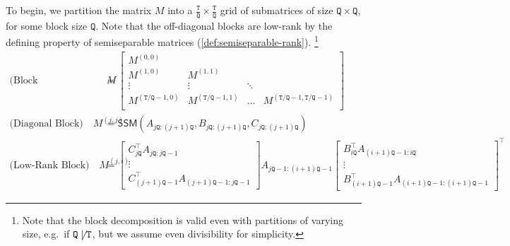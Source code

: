 To begin, we partition the matrix $M$ into a $\frac{\mathtt{T}}{\mathtt{Q}} \times \frac{\mathtt{T}}{\mathtt{Q}}$ grid of submatrices of size $\mathtt{Q} \times \mathtt{Q}$,
for some block size $\mathtt{Q}$.
Note that the off-diagonal blocks are low-rank by the defining property of semiseparable matrices (\cref{def:semiseparable-rank}).%
\footnote{Note that the block decomposition is valid even with partitions of varying size, e.g.\ if $\mathtt{Q} \not\mid \mathtt{T}$, but we assume even divisibility for simplicity.}
\begin{align*}%
  \text{(Block Decomposition)} \quad M &=
  \begin{bmatrix}
    M^{(0,0)} \\
    M^{(1,0)} & M^{(1,1)} \\
    \vdots & \vdots & \ddots \\
    M^{(\mathtt{T}/\mathtt{Q}-1,0)} & M^{(\mathtt{T}/\mathtt{Q}-1,1)} & \dots & M^{(\mathtt{T}/\mathtt{Q}-1,\mathtt{T}/\mathtt{Q}-1)} \\
  \end{bmatrix}
  \\
  \text{(Diagonal Block)} \quad M^{(j,j)} &= \mathsf{SSM}(A_{j\mathtt{Q}:(j+1)\mathtt{Q}}, B_{j\mathtt{Q}:(j+1)\mathtt{Q}}, C_{j\mathtt{Q}:(j+1)\mathtt{Q}}) \\
  \text{(Low-Rank Block)} \quad M^{(j,i)} &= 
  \begin{bmatrix}C_{j\mathtt{Q}}^{\top} A_{j\mathtt{Q}:j\mathtt{Q}-1} \\[1pt] \vdots \\[1pt] C_{(j+1)\mathtt{Q}-1}^{\top} A_{(j+1)\mathtt{Q}-1:j\mathtt{Q}-1}\end{bmatrix}
  A_{j\mathtt{Q}-1:(i+1)\mathtt{Q}-1}
  \begin{bmatrix}B_{i\mathtt{Q}}^{\top} A_{(i+1)\mathtt{Q}-1:i\mathtt{Q}} \\[1pt] \vdots \\[1pt] B_{(i+1)\mathtt{Q}-1}^{\top} A_{(i+1)\mathtt{Q}-1:(i+1)\mathtt{Q}-1}\end{bmatrix}^{\top}
\end{align*}

